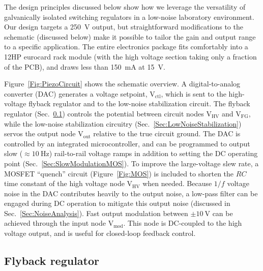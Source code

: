 \documentclass[aip,rsi,reprint]{revtex4-1} %
\begin{document}
The design principles discussed below show how we leverage the versatility of galvanically isolated switching regulators in a low-noise laboratory environment. 
Our design targets a \SI{250}{\volt} output, but straightforward modifications to the schematic (discussed below) make it possible to tailor the gain and output range to a specific application.
The entire electronics package fits comfortably into a 12HP eurocard rack module (with the high voltage section taking only a fraction of the PCB), and draws less than \SI{150}{\milli\ampere} at \SI{15}{\volt}.

Figure~\ref{Fig:PiezoCircuit} shows the schematic overview. 
A digital-to-analog converter (DAC) generates a voltage setpoint, $\text{V}_\text{ctl}$, which is sent to the high-voltage flyback regulator and to the low-noise stabilization circuit.
The flyback regulator (Sec.~\ref{Sec:DRV2700}) controls the potential between circuit nodes $\text{V}_\text{HV}$ and $\text{V}_\text{FG}$, while the low-noise stabilization circuitry (Sec.~\ref{Sec:LowNoiseStabilization}) servos the output node $\text{V}_\text{out}$ relative to the true circuit ground.
The DAC is controlled by an integrated microcontroller, and can be programmed to output slow ($\approx\SI{10}{\hertz}$) rail-to-rail voltage ramps in addition to setting the DC operating point (Sec.~\ref{Sec:SlowModulationMOS}).
To improve the large-voltage slew rate, a MOSFET ``quench'' circuit (Figure~\ref{Fig:MOS}) is included to shorten the $RC$ time constant of the high voltage node $\text{V}_\text{HV}$ when needed.
Because $1/f$ voltage noise in the DAC contributes heavily to the output noise, a low-pass filter can be engaged during DC operation to mitigate this output noise (discussed in Sec.~\ref{Sec:NoiseAnalysis}).
Fast output modulation between $\pm\SI{10}{\volt}$ can be achieved through the input node $\text{V}_\text{mod}$.
This node is DC-coupled to the high voltage output, and is useful for closed-loop feedback control.



\subsection{Flyback regulator}
\label{Sec:DRV2700}
\end{document}
